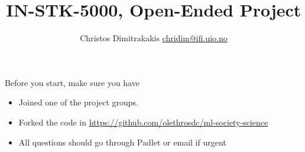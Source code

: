 \documentclass[a4paper,twoside]{article}
\title{IN-STK-5000, Open-Ended Project}
\author{Christos Dimitrakakis \url{chridim@ifi.uio.no}}
\begin{document}
\maketitle

Before you start, make sure you have
\begin{itemize}
\item Joined one of the project groups.
\item Forked the code in \url{https://github.com/olethrosdc/ml-society-science}
\item All questions should go through Padlet or email if urgent
\end{itemize}


%
%
\end{document}
